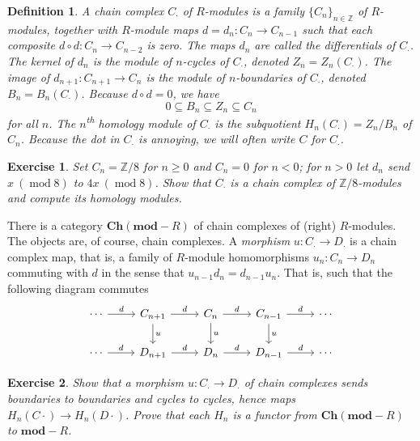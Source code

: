 \newtheorem{definition}{Definition}
\begin{definition}
  A \emph{chain complex} $C_\cdot$ of $R$-modules is a family $\{C_n\}_{n \in \mathbb{Z}}$ of $R$-modules, together with $R$-module maps $d = d_n : C_n \to C_{n - 1}$ such that each composite $d \circ d : C_n \to C_{n - 2}$ is zero. The maps $d_n$ are called the \emph{differentials} of $C_\cdot$. The kernel of $d_n$ is the module of \emph{$n$-cycles} of $C_\cdot$, denoted $Z_n = Z_n(C_\cdot)$. The image of $d_{n + 1} : C_{n + 1} \to C_n$ is the module of \emph{$n$-boundaries} of $C_\cdot$, denoted $B_n = B_n(C_\cdot)$. Because $d \circ d = 0$, we have
  \[
    0 \subseteq B_n \subseteq Z_n \subseteq C_n
  \]
  for all $n$. The \emph{$n$\textsuperscript{th} homology module} of $C_\cdot$ is the subquotient $H_n(C_\cdot) = Z_n / B_n$ of $C_n$. Because the dot in $C_\cdot$ is annoying, we will often write $C$ for $C_\cdot$.
\end{definition}

\newtheorem{exercise}{Exercise}
\begin{exercise}
  Set $C_n = \mathbb{Z} / 8$ for $n \geq 0$ and $C_n = 0$ for $n < 0$; for $n > 0$ let $d_n$ send $x\ (\operatorname{mod} 8)$ to $4x\ (\operatorname{mod} 8)$. Show that $C_\cdot$ is a chain complex of $\mathbb{Z} / 8$-modules and compute its homology modules.
\end{exercise}

There is a category $\mathbf{Ch}(\mathbf{mod}\!\!-\!\!R)$ of chain complexes of (right) $R$-modules. The objects are, of course, chain complexes. A \emph{morphism} $u : C_\cdot \to D_\cdot$ is a chain complex map, that is, a family of $R$-module homomorphisms $u_n : C_n \to D_n$ commuting with $d$ in the sense that $u_{n - 1} d_n = d_{n - 1} u_n$. That is, such that the following diagram commutes
\begin{equation*}
  \begin{tikzcd}
    \cdots \ar[r, "d"] & C_{n + 1} \ar[d, "u"] \ar[r, "d"] & C_n \ar[d, "u"] \ar[r, "d"] & C_{n - 1} \ar[d, "u"] \ar[r, "d"] & \cdots \\
    \cdots \ar[r, "d"] & D_{n + 1} \ar[r, "d"] & D_n \ar[r, "d"] & D_{n - 1} \ar[r, "d"] & \cdots
  \end{tikzcd}
\end{equation*}

\begin{exercise}
  Show that a morphism $u : C_\cdot \to D_\cdot$ of chain complexes sends boundaries to boundaries and cycles to cycles, hence maps $H_n(C\cdot) \to H_n(D\cdot)$. Prove that each $H_n$ is a functor from $\mathbf{Ch}(\mathbf{mod}\!\!-\!\!R)$ to $\mathbf{mod}\!\!-\!\!R$.
\end{exercise}

